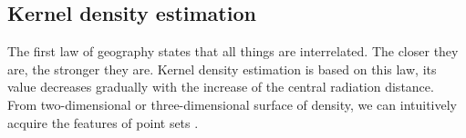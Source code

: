 \documentclass[11pt]{report}
\begin{document}
	
	\subsection{Kernel density estimation}
	The first law of geography states that all things are interrelated. The closer they are, the stronger they are. Kernel density estimation is based on this law, its value decreases gradually with the increase of the central radiation distance. From two-dimensional or three-dimensional surface of density, we can intuitively acquire the features of point sets \cite{1990}. 
	
\end{document}
